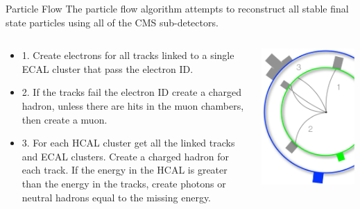 \begin{frame}{Particle Flow}
The particle flow algorithm attempts to reconstruct all stable final state particles using all of the CMS sub-detectors.

\begin{columns}[T]
  \begin{column}{0.6\textwidth}
\footnotesize
    \begin{itemize}
    \item
      1. Create electrons for all tracks linked to a single ECAL cluster that pass the electron ID.
    \item
      2. If the tracks fail the electron ID create a charged hadron, unless there are hits in the muon chambers, then create a muon.
    \item
      3. For each HCAL cluster get all the linked tracks and ECAL clusters. Create a charged hadron for each track. If the energy in the HCAL is greater than the energy in the tracks, create photons or neutral hadrons equal to the missing energy.
    \end{itemize}
  \end{column}
  \begin{column}{0.40\textwidth}
    \includegraphics[width=0.99\textwidth]{images/pf3.pdf}
  \end{column}
\end{columns}
\end{frame}

